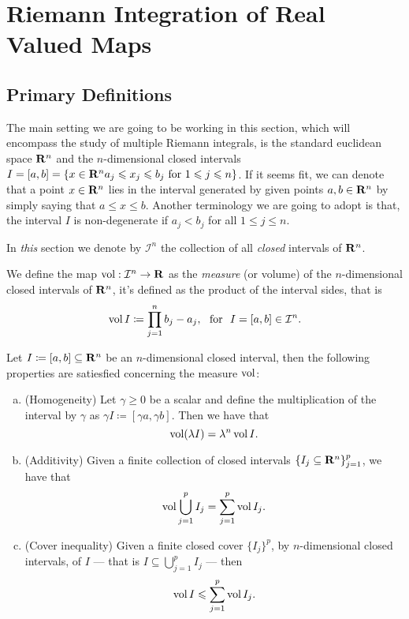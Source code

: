 \section{Riemann Integration of Real Valued Maps}

\subsection{Primary Definitions}

The main setting we are going to be working in this section, which will
encompass the study of multiple Riemann integrals, is the standard euclidean
space \(\mathbf{R}^n\) and the \(n\)-dimensional closed intervals \(I = [a, b] = \{x \in
\mathbf{R}^n \relax a_j \leqslant x_j \leqslant b_j \text{ for } 1 \leqslant j \leqslant n\}\). If it seems fit,
we can denote that a point \(x \in \mathbf{R}^n\) lies in the interval generated by
given points \(a, b \in \mathbf{R}^n\) by simply saying that \(a \leq x \leq
b\). Another terminology we are going to adopt is that, the interval \(I\) is
non-degenerate if \(a_j < b_j\) for all \(1 \leq j \leq n\).

\begin{notation}
In \emph{this} section we denote by \(\mathcal I^n\) the collection of all
\emph{closed} intervals of \(\mathbf{R}^n\).
\end{notation}

\begin{definition}
\label{def:interval-measure}
We define the map \(\operatorname{vol}: \mathcal I^n \to \mathbf{R}\) as the \emph{measure} (or
volume) of the \(n\)-dimensional closed intervals of \(\mathbf{R}^n\), it's defined as
the product of the interval sides, that is
\[
  \operatorname{vol} I \coloneq \prod_{j=1}^n b_j - a_j,
  \ \text{ for }\ I = [a, b] \in \mathcal I^n.
\]
\end{definition}

\begin{corollary}
\label{cor:interval-measure-properties}
Let \(I \coloneq [a, b] \subseteq \mathbf{R}^n\) be an \(n\)-dimensional closed
interval, then the following properties are satiesfied concerning the measure
\(\operatorname{vol}\):
\begin{enumerate}[(a)]\setlength\itemsep{0em}
\item (Homogeneity) Let \(\gamma \geq 0\) be a scalar and define the
  multiplication of the interval by \(\gamma\) as \(\gamma I \coloneq [\gamma
  a, \gamma b]\). Then we have that
  \[
    \operatorname{vol}(\lambda I) = \lambda^n \operatorname{vol} I.
  \]
\item (Additivity) Given a finite collection of closed intervals \(\{I_{j}
  \subseteq \mathbf{R}^n\}_{j = 1}^p\), we have that
  \[
    \operatorname{vol} \bigcup_{j=1}^p I_j = \sum_{j=1}^p \operatorname{vol} I_j.
  \]
\item (Cover inequality) Given a finite closed cover \(\{I_{j}\}^{p}\), by
  \(n\)-dimensional closed intervals, of \(I\) --- that is \(I \subseteq
  \bigcup_{j=1}^p I_j\) --- then
  \[
    \operatorname{vol} I \leqslant \sum_{j=1}^p \operatorname{vol} I_j.
  \]
\end{enumerate}
\end{corollary}


